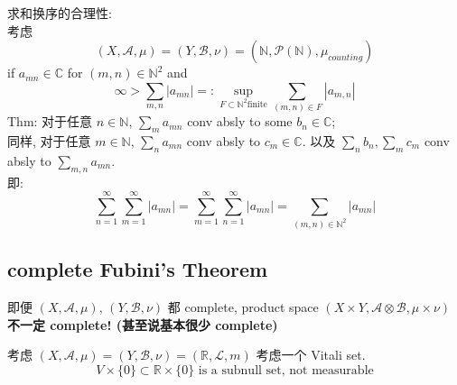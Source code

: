 \documentclass[lang=cn,11pt]{elegantbook}
\begin{document}
\begin{example} 
求和换序的合理性:\\
考虑 $$(X, \mathcal{A}, \mu) = (Y , \mathcal{B}, \nu) = (\mathbb{N}, \mathcal{P}(\mathbb{N}), \mu_{counting})$$if $a_{mn} \in \mathbb{C}$ for $(m,n) \in \mathbb{N}^2$ and \[
\infty > \sum_{m,n} |a_{mn}| =: \sup_{F \subset \mathbb{N}^2  \text{finite}} \sum_{(m,n) \in F}  |a_{m,n}|
\]
Thm: 对于任意 $n\in\mathbb{N}$,  $\sum_m a_{mn}$ conv absly to some $b_n \in \mathbb{C}$; \\
同样, 对于任意 $m\in\mathbb{N}$, $\sum_n a_{mn}$ conv absly to $c_m \in \mathbb{C}$.
以及 $\sum_n b_n, \sum_m c_m$ conv absly to $\sum_{m,n} a_{mn}$.\\
即: \[
\sum_{n=1}^\infty \sum_{m=1}^\infty |a_{mn}| = \sum_{m=1}^\infty \sum_{n=1}^\infty |a_{mn}| = \sum_{(m,n) \in\mathbb{N}^2} |a_{mn}|
\]
\end{example}


\subsection{complete Fubini's Theorem}
\begin{remark}
即便 \((X, \mathcal{A}, \mu)\), $ (Y , \mathcal{B}, \nu)$ 都 complete, product space \((X\times Y , \mathcal{A} \otimes \mathcal{B} , \mu\times \nu  )\) \textbf{不一定 complete! (甚至说基本很少 complete)}
\end{remark}

\begin{example}
      考虑 $(X, \mathcal{A}, \mu) = (Y , \mathcal{B}, \nu) = (\mathbb{R}, \mathcal{L}, m)$
       考虑一个 Vitali set. \[
       V \times \{0\} \subset \mathbb{R} \times \{0\} \text{ is a subnull set, not measurable}
       \]
\end{example}
\end{document}
